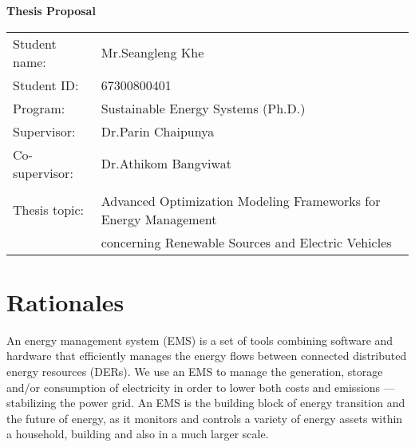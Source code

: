 \documentclass[12pt]{report}
\date{}
\begin{document}
\begin{center}
  \bfseries Thesis Proposal
\end{center}

\begin{table}[H]
  \begin{tabular}{@{}ll@{}}
    Student name:   & Mr.Seangleng Khe \\
    Student ID: & 67300800401 \\
    Program: & Sustainable Energy Systems (Ph.D.) \\
    Supervisor: & Dr.Parin Chaipunya \\
    Co-supervisor: & Dr.Athikom Bangviwat \\ \\
    Thesis topic: & Advanced Optimization Modeling Frameworks for Energy Management \\ & concerning Renewable Sources and Electric Vehicles
  \end{tabular}
\end{table}

\section{Rationales}



An energy management system (EMS) is a set of tools combining software and hardware that efficiently manages the energy flows between connected distributed energy resources (DERs). 
We use an EMS to manage the generation, storage and/or consumption of electricity in order to lower both costs and emissions --- stabilizing the power grid. 
An EMS is the building block of energy transition and the future of energy, as it monitors and controls a variety of energy assets within a household, building and also in a much larger scale.
\end{document}
